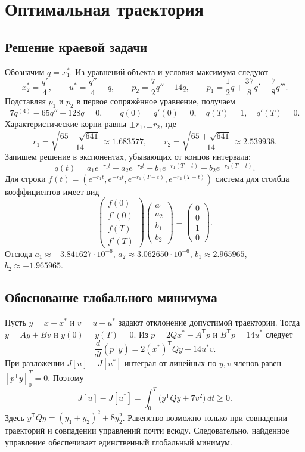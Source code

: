 \documentclass[12pt,a4paper]{article}
\begin{document}
\clearpage
\section{Оптимальная траектория}
\subsection{Решение краевой задачи}
Обозначим $q=x_1^*$. Из уравнений объекта и условия максимума следуют
\[
  x_2^*=\frac{q'}{4},\qquad
  u^*=\frac{q''}{4}-q,\qquad
  p_2=\frac{7}{2}q''-14q,\qquad
  p_1=\frac12 q+\frac{37}{8}q'-\frac78q''' .
\]
Подставляя $p_1$ и $p_2$ в первое сопряжённое уравнение, получаем
\begin{equation}
  7q^{(4)}-65q''+128q=0,\qquad
  q(0)=q'(0)=0,\quad q(T)=1,\quad q'(T)=0.
\end{equation}
Характеристические корни равны $\pm r_1,\pm r_2$, где
\[
  r_1=\sqrt{\frac{65-\sqrt{641}}{14}}\approx1.683577,\qquad
  r_2=\sqrt{\frac{65+\sqrt{641}}{14}}\approx2.539938 .
\]
Запишем решение в экспонентах, убывающих от концов интервала:
\begin{equation}
  q(t)=a_1 e^{-r_1 t}+a_2 e^{-r_2 t}
       +b_1 e^{-r_1(T-t)}+b_2 e^{-r_2(T-t)}.
  \label{eq:profile}
\end{equation}
Для строки $f(t)=(e^{-r_1t},e^{-r_2t},e^{-r_1(T-t)},e^{-r_2(T-t)})$
система для столбца коэффициентов имеет вид
\[
  \begin{pmatrix} f(0)\\ f'(0)\\ f(T)\\ f'(T)\end{pmatrix}
  \begin{pmatrix}a_1\\a_2\\b_1\\b_2\end{pmatrix}
  =\begin{pmatrix}0\\0\\1\\0\end{pmatrix}.
\]
Отсюда $a_1\approx-3.841627\cdot10^{-6}$, $a_2\approx3.062650\cdot10^{-6}$,
$b_1\approx2.965965$, $b_2\approx-1.965965$.

\subsection{Обоснование глобального минимума}
Пусть $y=x-x^*$ и $v=u-u^*$ задают отклонение допустимой траектории.
Тогда $\dot y=Ay+Bv$ и $y(0)=y(T)=0$. Из
$\dot p=2Qx^*-A^{\mathsf T}p$ и $B^{\mathsf T}p=14u^*$ следует
\[
  \frac{d}{dt}(p^{\mathsf T}y)=2(x^*)^{\mathsf T}Qy+14u^*v .
\]
При разложении $J[u]-J[u^*]$ интеграл от линейных по $y,v$ членов
равен $[p^{\mathsf T}y]_0^T=0$. Поэтому
\begin{equation}
  J[u]-J[u^*]=\int_0^T\bigl(y^{\mathsf T}Qy+7v^2\bigr)\,dt\geq0 .
  \label{eq:costdifference}
\end{equation}
Здесь $y^{\mathsf T}Qy=(y_1+y_2)^2+8y_2^2$.
Равенство возможно только при совпадении траекторий и совпадении
управлений почти всюду. Следовательно, найденное управление
обеспечивает единственный глобальный минимум.
\end{document}
